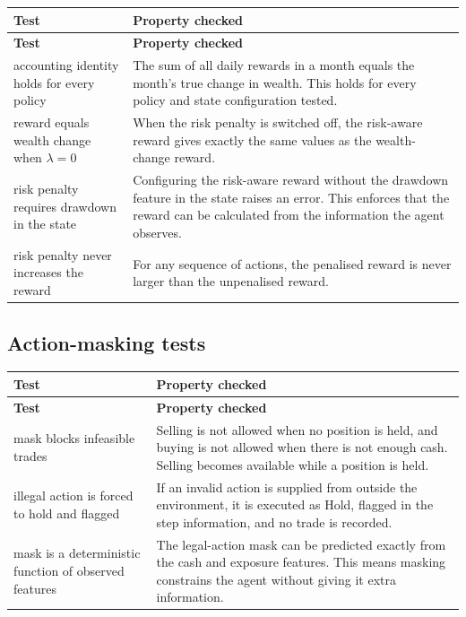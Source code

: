 \begin{longtable}{@{}p{}p{}@{}}
\toprule
\textbf{Test} & \textbf{Property checked} \\
\midrule
\endfirsthead
\toprule
\textbf{Test} & \textbf{Property checked} \\
\midrule
\endhead
\bottomrule
\endlastfoot
accounting identity holds for every policy & The sum of all daily
  rewards in a month equals the month's true change in wealth. This
  holds for every policy and state configuration tested. \\
\rowsep
reward equals wealth change when \(\lambda = 0\) & When the risk penalty
  is switched off, the risk-aware reward gives exactly the same values as
  the wealth-change reward. \\
\rowsep
risk penalty requires drawdown in the state & Configuring the risk-aware
  reward without the drawdown feature in the state raises an error. This
  enforces that the reward can be calculated from the information the
  agent observes. \\
\rowsep
risk penalty never increases the reward & For any sequence of actions,
  the penalised reward is never larger than the unpenalised reward. \\
\end{longtable}

\subsection*{Action-masking tests}

\begin{longtable}{@{}p{}p{}@{}}
\toprule
\textbf{Test} & \textbf{Property checked} \\
\midrule
\endfirsthead
\toprule
\textbf{Test} & \textbf{Property checked} \\
\midrule
\endhead
\bottomrule
\endlastfoot
mask blocks infeasible trades & Selling is not allowed when no position
  is held, and buying is not allowed when there is not enough cash.
  Selling becomes available while a position is held. \\
\rowsep
illegal action is forced to hold and flagged & If an invalid action is
  supplied from outside the environment, it is executed as Hold, flagged
  in the step information, and no trade is recorded. \\
\rowsep
mask is a deterministic function of observed features & The legal-action
  mask can be predicted exactly from the cash and exposure features. This
  means masking constrains the agent without giving it extra
  information. \\
\end{longtable}
